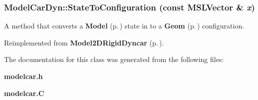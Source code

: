 \subsubsection{ Model\-Car\-Dyn::State\-To\-Configuration (const {\bf MSLVector} \& {\em x})\hspace{0.3cm}{\tt  [virtual]}}\label{classModelCarDyn_a2}


A method that converts a {\bf Model} {\rm (p.\,\pageref{classModel})} state in to a {\bf Geom} {\rm (p.\,\pageref{classGeom})} configuration.



Reimplemented from {\bf Model2DRigid\-Dyncar} {\rm (p.\,\pageref{classModel2DRigidDyncar_a3})}.

The documentation for this class was generated from the following files:\begin{CompactItemize}
\item 
{\bf modelcar.h}\item 
{\bf modelcar.C}\end{CompactItemize}
